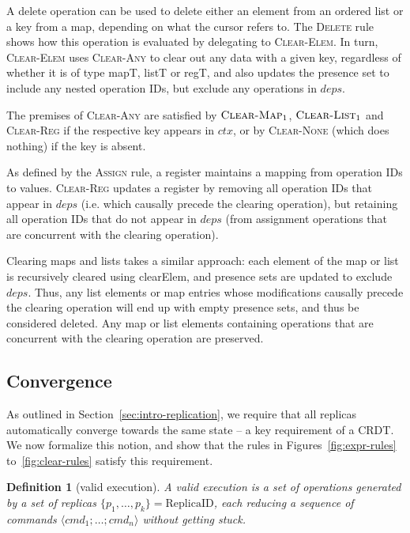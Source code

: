 \documentclass[10pt,journal,compsoc]{IEEEtran}
\newtheorem{definition}{Definition}
\begin{document}
A \textsf{delete} operation can be used to delete either an element from an ordered list or a key from a map, depending on what the cursor refers to. The \textsc{Delete} rule shows how this operation is evaluated by delegating to \textsc{Clear-Elem}. In turn, \textsc{Clear-Elem} uses \textsc{Clear-Any} to clear out any data with a given key, regardless of whether it is of type \textsf{mapT}, \textsf{listT} or \textsf{regT}, and also updates the presence set to include any nested operation IDs, but exclude any operations in $\mathit{deps}$.

The premises of \textsc{Clear-Any} are satisfied by $\textsc{Clear-Map}_1$, $\textsc{Clear-List}_1$ and \textsc{Clear-Reg} if the respective key appears in $\mathit{ctx}$, or by \textsc{Clear-None} (which does nothing) if the key is absent.

As defined by the \textsc{Assign} rule, a register maintains a mapping from operation IDs to values. \textsc{Clear-Reg} updates a register by removing all operation IDs that appear in $\mathit{deps}$ (i.e. which causally precede the clearing operation), but retaining all operation IDs that do not appear in $\mathit{deps}$ (from assignment operations that are concurrent with the clearing operation).

Clearing maps and lists takes a similar approach: each element of the map or list is recursively cleared using \textsf{clearElem}, and presence sets are updated to exclude $\mathit{deps}$. Thus, any list elements or map entries whose modifications causally precede the clearing operation will end up with empty presence sets, and thus be considered deleted. Any map or list elements containing operations that are concurrent with the clearing operation are preserved.

\subsection{Convergence}\label{sec:convergence}

As outlined in Section~\ref{sec:intro-replication}, we require that all replicas automatically converge towards the same state -- a key requirement of a CRDT. We now formalize this notion, and show that the rules in Figures~\ref{fig:expr-rules} to~\ref{fig:clear-rules} satisfy this requirement.

\begin{definition}[valid execution]\label{def:valid-exec}
A \emph{valid execution} is a set of operations generated by a set of replicas $\{p_1, \dots, p_k\} = \mathrm{ReplicaID}$, each reducing a sequence of commands $\langle \mathit{cmd}_1 \mathbin{;} \dots \mathbin{;} \mathit{cmd}_n \rangle$ without getting stuck.
\end{definition}
\end{document}
